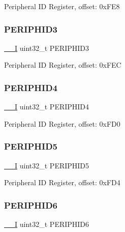 Peripheral ID Register, offset\+: 0x\+F\+E8 \mbox{\label{struct_m_t_b_d_w_t___type_a9ebff4a243ecc983d7f4de875b7669d6}} 
\subsubsection{\texorpdfstring{PERIPHID3}{PERIPHID3}}
{\footnotesize\ttfamily \mbox{\hyperlink{core__cm0plus_8h_af63697ed9952cc71e1225efe205f6cd3}{\+\_\+\+\_\+I}} uint32\+\_\+t P\+E\+R\+I\+P\+H\+I\+D3}

Peripheral ID Register, offset\+: 0x\+F\+EC \mbox{\label{struct_m_t_b_d_w_t___type_a6d57dd25c691557286930237edb832ab}} 
\subsubsection{\texorpdfstring{PERIPHID4}{PERIPHID4}}
{\footnotesize\ttfamily \mbox{\hyperlink{core__cm0plus_8h_af63697ed9952cc71e1225efe205f6cd3}{\+\_\+\+\_\+I}} uint32\+\_\+t P\+E\+R\+I\+P\+H\+I\+D4}

Peripheral ID Register, offset\+: 0x\+F\+D0 \mbox{\label{struct_m_t_b_d_w_t___type_a97fbe48fa2f04fa8bd5f27b255d5e0ab}} 
\subsubsection{\texorpdfstring{PERIPHID5}{PERIPHID5}}
{\footnotesize\ttfamily \mbox{\hyperlink{core__cm0plus_8h_af63697ed9952cc71e1225efe205f6cd3}{\+\_\+\+\_\+I}} uint32\+\_\+t P\+E\+R\+I\+P\+H\+I\+D5}

Peripheral ID Register, offset\+: 0x\+F\+D4 \mbox{\label{struct_m_t_b_d_w_t___type_acd8505982b40f4478a3d82c4e0c884b4}} 
\subsubsection{\texorpdfstring{PERIPHID6}{PERIPHID6}}
{\footnotesize\ttfamily \mbox{\hyperlink{core__cm0plus_8h_af63697ed9952cc71e1225efe205f6cd3}{\+\_\+\+\_\+I}} uint32\+\_\+t P\+E\+R\+I\+P\+H\+I\+D6}

